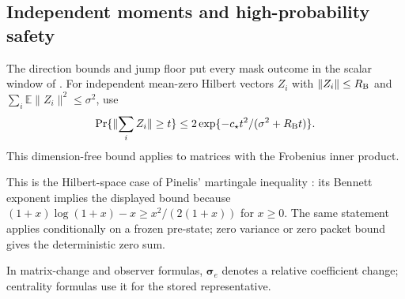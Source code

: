 \documentclass[11pt]{article}
\theoremstyle{remark}
\newcommand{\ssigma}{\boldsymbol{\sigma}}
\newcommand{\Ex}{\mathbb E}
\newcommand{\norm}[1]{\lVert#1\rVert}
\begin{document}
\subsection{Independent moments and high-probability safety}

The direction bounds and jump floor put every mask outcome in the scalar window
of .
For independent mean-zero Hilbert vectors $Z_i$ with $\norm{Z_i}\le R_{\rm B}$ and
$\sum_i\Ex\norm{Z_i}^2\le\sigma^2$, use
\[
 \Pr\{\norm{\sum_i Z_i}\ge t\}
 \le2\exp\{-c_\star t^2/(\sigma^2+R_{\rm B}t)\}.
\]
This dimension-free bound applies to matrices with the Frobenius inner product.

This is the Hilbert-space case of Pinelis' martingale inequality
\cite[Theorem~3.4]{P94:journal}: its Bennett exponent implies the displayed
bound because $(1+x)\log(1+x)-x\ge x^2/(2(1+x))$ for $x\ge0$.
The same statement applies conditionally on a frozen pre-state; zero variance or
zero packet bound gives the deterministic zero sum.

In matrix-change and observer formulas, $\ssigma_e$ denotes a relative coefficient
change; centrality formulas use it for the stored representative.
\end{document}
